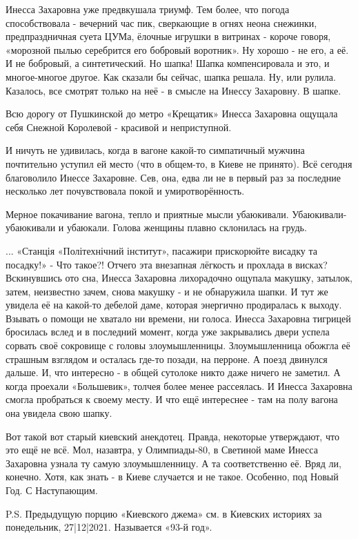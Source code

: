 Инесса Захаровна уже предвкушала триумф.  Тем более, что погода способствовала
- вечерний час пик, сверкающие в огнях неона снежинки, предпраздничная суета
ЦУМа, ёлочные игрушки в витринах - короче говоря, «морозной пылью серебрится
его бобровый воротник». Ну хорошо - не его, а её. И не бобровый, а
синтетический. Но шапка! Шапка компенсировала и это, и многое-многое другое.
Как сказали бы сейчас, шапка решала. Ну, или рулила. Казалось, все смотрят
только на неё - в смысле на Инессу Захаровну. В шапке. 


Всю дорогу от Пушкинской до метро «Крещатик» Инесса Захаровна ощущала себя
Снежной Королевой - красивой и неприступной.

И ничуть не удивилась, когда в вагоне какой-то симпатичный мужчина почтительно
уступил ей место (что в общем-то, в Киеве не принято). Всё сегодня благоволило
Инессе Захаровне. Сев, она, едва ли не в первый раз за последние несколько лет
почувствовала покой и умиротворённость. 

Мерное покачивание вагона, тепло и приятные мысли убаюкивали.
Убаюкивали-убаюкивали и убаюкали. Голова женщины плавно склонилась на грудь.

... «Станція «Політехнічний інститут», пасажири  прискорюйте висадку та
посадку!» - Что такое?! Отчего эта внезапная лёгкость и прохлада в висках?
Вскинувшись ото сна, Инесса Захаровна лихорадочно ощупала макушку, затылок,
затем, неизвестно зачем, снова макушку - и не обнаружила шапки. И тут же
увидела её на какой-то дебелой даме, которая энергично продиралась к выходу.
Взывать о помощи не хватало ни времени, ни голоса. Инесса Захаровна тигрицей
бросилась вслед и в последний момент, когда уже закрывались двери успела
сорвать своё сокровище с головы злоумышленницы. Злоумышленница обожгла её
страшным взглядом и осталась где-то позади, на перроне. А поезд двинулся
дальше. И, что интересно - в общей сутолоке никто даже ничего не заметил. А
когда проехали «Большевик», толчея более менее рассеялась. И Инесса Захаровна
смогла пробраться к своему месту. И что ещё интереснее - там на полу вагона она
увидела свою шапку. 

Вот такой вот старый киевский анекдотец. Правда, некоторые утверждают, что это
ещё не всё. Мол, назавтра, у Олимпиады-80, в Светиной маме Инесса Захаровна
узнала ту самую злоумышленницу. А та  соответственно её. Вряд ли, конечно.
Хотя, как знать - в Киеве случается и не такое. Особенно, под Новый Год. С
Наступающим.

P.S. Предыдущую порцию «Киевского джема» см. в Киевских историях за
понедельник, 27|12|2021. Называется «93-й год».

